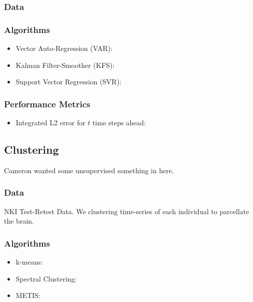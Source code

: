 \documentclass[12pt]{article}
\begin{document}
\subsubsection{Data}

\subsubsection{Algorithms}

\begin{itemize} \itemsep0pt
	\item Vector Auto-Regression (VAR):
	\item Kalman Filter-Smoother (KFS):
	\item Support Vector Regression (SVR): 
\end{itemize}

\subsubsection{Performance Metrics}

\begin{itemize} \itemsep0pt
	\item Integrated L2 error for $t$ time steps ahead: 
\end{itemize}



\subsection{Clustering}

Cameron wanted some unsupervised something in here.

\subsubsection{Data}

NKI Test-Retest Data.  We clustering time-series of each individual to parcellate the brain.

\subsubsection{Algorithms}

\begin{itemize} \itemsep0pt
	\item k-means:
	\item Spectral Clustering:
	\item METIS: 
\end{itemize}
\end{document}
